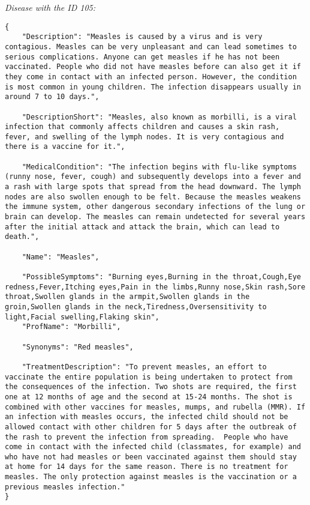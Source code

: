 \vspace{1cm}
\textit{Disease with the ID 105:} 
\begin{lstlisting}[basicstyle=\tiny, caption={Response ApiMedic API (issue ID 105)}]
{
	"Description": "Measles is caused by a virus and is very contagious. Measles can be very unpleasant and can lead sometimes to serious complications. Anyone can get measles if he has not been vaccinated. People who did not have measles before can also get it if they come in contact with an infected person. However, the condition is most common in young children. The infection disappears usually in around 7 to 10 days.",
	
	"DescriptionShort": "Measles, also known as morbilli, is a viral infection that commonly affects children and causes a skin rash, fever, and swelling of the lymph nodes. It is very contagious and there is a vaccine for it.",
	
	"MedicalCondition": "The infection begins with flu-like symptoms (runny nose, fever, cough) and subsequently develops into a fever and a rash with large spots that spread from the head downward. The lymph nodes are also swollen enough to be felt. Because the measles weakens the immune system, other dangerous secondary infections of the lung or brain can develop. The measles can remain undetected for several years after the initial attack and attack the brain, which can lead to death.",
	
	"Name": "Measles",
	
	"PossibleSymptoms": "Burning eyes,Burning in the throat,Cough,Eye redness,Fever,Itching eyes,Pain in the limbs,Runny nose,Skin rash,Sore throat,Swollen glands in the armpit,Swollen glands in the groin,Swollen glands in the neck,Tiredness,Oversensitivity to light,Facial swelling,Flaking skin",
	"ProfName": "Morbilli",
	
	"Synonyms": "Red measles",
	
	"TreatmentDescription": "To prevent measles, an effort to vaccinate the entire population is being undertaken to protect from the consequences of the infection. Two shots are required, the first one at 12 months of age and the second at 15-24 months. The shot is combined with other vaccines for measles, mumps, and rubella (MMR). If an infection with measles occurs, the infected child should not be allowed contact with other children for 5 days after the outbreak of the rash to prevent the infection from spreading.  People who have come in contact with the infected child (classmates, for example) and who have not had measles or been vaccinated against them should stay at home for 14 days for the same reason. There is no treatment for measles. The only protection against measles is the vaccination or a previous measles infection."	
}
\end{lstlisting}



